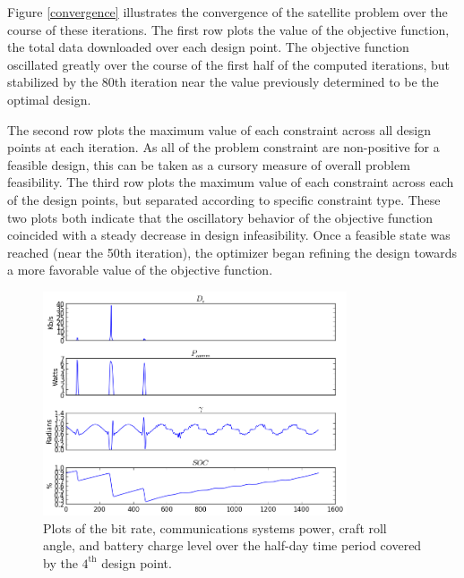 \documentclass[]{aiaa-tc} %
\begin{document}
    Figure \ref{convergence} illustrates the convergence of the satellite problem over the course of
    these iterations. The first row plots the
    value of the objective function, the total data downloaded over each design point. The objective
    function oscillated greatly over the course of the first half of the computed iterations, but
    stabilized by the 80th iteration near the value previously determined \cite{CADRE2012}
    to be the optimal design.

    The second row plots the maximum value of each constraint across all design points at
    each iteration. As all of the problem constraint are non-positive for a feasible design,
    this can be taken as a cursory measure of overall problem feasibility.
    The third row plots the maximum value of each constraint across each of the design points,
    but separated according to specific constraint type. These two plots both indicate that the
    oscillatory behavior of the objective function coincided with a steady decrease in design
    infeasibility. Once a feasible state was reached (near the 50th iteration), the optimizer
    began refining the design towards a more favorable value of the objective function.

    \begin{figure}
    \centering
    \includegraphics[width=0.8\textwidth]{images/pt_3_data}
    \caption[width=0.4\textwidth]{Plots of the bit rate, communications systems power, craft roll angle,
    and battery charge level over the half-day time period covered by the $4^{\textrm{th}}$ design point.
    \label{pt3_data_results}
    }
    \end{figure}
\end{document}

